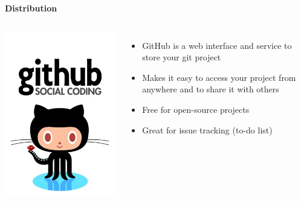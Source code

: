\documentclass[9pt,xcolor=pdftex,dvipsnames,table]{beamer}
\begin{document}
\begin{frame}{\textbf{Distribution}}
\begin{columns}
\centering
\includegraphics[width=1\textwidth]{images/github-logo.jpg}
\begin{itemize}
\item GitHub is a web interface and service to store your git project
\item Makes it easy to access your project from anywhere and to share
  it with others
\item Free for open-source projects
\item Great for issue tracking (to-do list)
\end{itemize}
\end{columns}
\end{frame}
\end{document}
